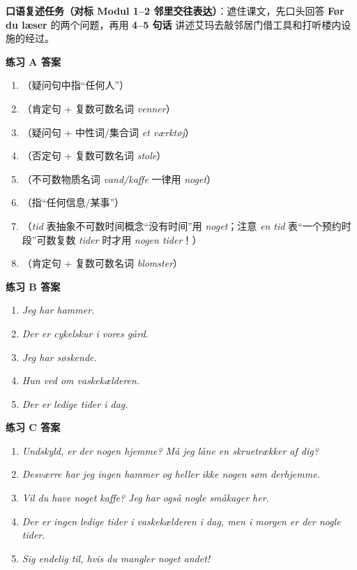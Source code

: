 
\textbf{口语复述任务（对标 Modul 1--2 邻里交往表达）}：遮住课文，先口头回答 \textbf{Før du læser} 的两个问题，再用 \textbf{4--5 句话} 讲述艾玛去敲邻居门借工具和打听楼内设施的经过。

\begin{answerbox}
\textbf{练习 A 答案}
\begin{enumerate}
  \item {}（疑问句中指“任何人”）
  \item {}（肯定句 + 复数可数名词 \textit{venner}）
  \item {}（疑问句 + 中性词/集合词 \textit{et værktøj}）
  \item {}（否定句 + 复数可数名词 \textit{stole}）
  \item {}（不可数物质名词 \textit{vand/kaffe} 一律用 \textit{noget}）
  \item {}（指“任何信息/某事”）
  \item {}（\textit{tid} 表抽象不可数时间概念“没有时间”用 \textit{noget}；注意 \textit{en tid} 表“一个预约时段”可数复数 \textit{tider} 时才用 \textit{nogen tider}！）
  \item {}（肯定句 + 复数可数名词 \textit{blomster}）
\end{enumerate}

\textbf{练习 B 答案}
\begin{enumerate}
  \item \textit{Jeg har  hammer.}
  \item \textit{Der er  cykelskur i vores gård.}
  \item \textit{Jeg har  søskende.}
  \item \textit{Hun ved  om vaskekælderen.}
  \item \textit{Der er  ledige tider i dag.}
\end{enumerate}

\textbf{练习 C 答案}
\begin{enumerate}
  \item \textit{Undskyld, er der nogen hjemme? Må jeg låne en skruetrækker af dig?}
  \item \textit{Desværre har jeg ingen hammer og heller ikke nogen søm derhjemme.}
  \item \textit{Vil du have noget kaffe? Jeg har også nogle småkager her.}
  \item \textit{Der er ingen ledige tider i vaskekælderen i dag, men i morgen er der nogle tider.}
  \item \textit{Sig endelig til, hvis du mangler noget andet!}
\end{enumerate}


\end{answerbox}
